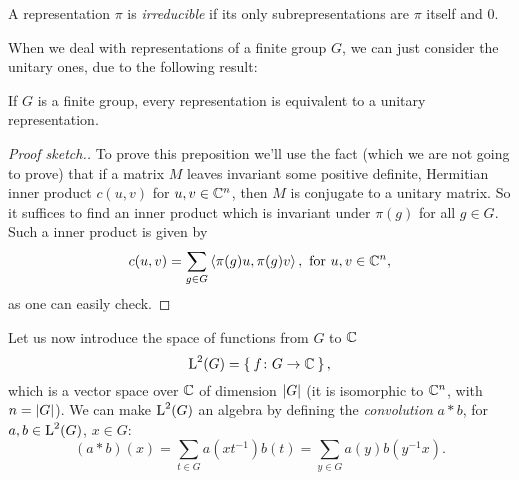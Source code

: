 \begin{defn}
A representation  $\pi$ is \emph{irreducible} if its only subrepresentations are $\pi$ itself and 0.
\end{defn}
When we deal with representations of a finite group $G$, we can just consider the unitary ones, due to the following result:
\begin{prop}
\label{unit:eqiv}
If $G$ is a finite group, every representation is equivalent to a unitary representation.
\end{prop}
\begin{proof}[Proof sketch.]
To prove this preposition we'll use the fact (which we are not going to prove) that if a matrix $M$ leaves invariant some positive definite, Hermitian inner product $c(u,v)$ for $u,v \in {\mathbb C}^n$, then $M$ is conjugate to a unitary matrix.
So it suffices to find an inner product which is invariant under $\pi(g)$ for all $g \in G$. Such a inner product is given by 
\[
c(u,v)= \sum_{g \in G} \Braket{ \pi(g)u, \pi(g)v } , \text{ for } u,v \in {\mathbb C}^n,
\]
as one can easily check.
%

\end{proof}
Let us now introduce  the space of functions from $G$ to ${\mathbb C}$ 
\begin{equation*}
\operatorname{L}^2(G)=\Set{f\colon G \rightarrow {\mathbb C}},
\end{equation*}
which is a vector space over ${\mathbb C}$ of dimension $\lvert G\rvert$ (it is isomorphic to ${\mathbb C}^n$, with $n=\lvert G\rvert$).
We can make $\operatorname{L}^2(G)$ an algebra by defining the \emph{convolution} $a\ast b$, for $a,b\in \operatorname{L}^2(G)$, $x\in G$:
\begin{equation*}
(a\ast b)(x)=\sum_{t \in G} a(xt^{-1})b(t)=\sum_{y \in G} a(y)b(y^{-1}x).
\end{equation*}

